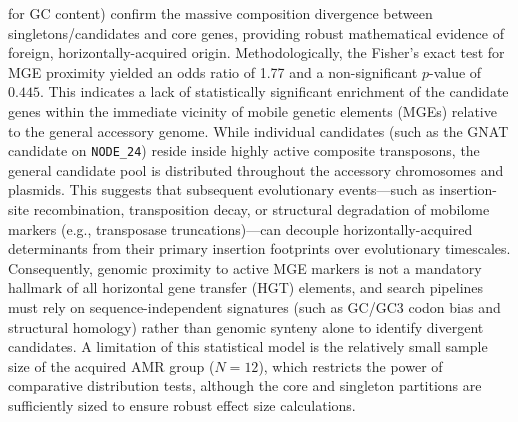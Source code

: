 \documentclass[pdflatex,sn-mathphys-num]{sn-jnl}
\begin{document}
for GC content) confirm the massive composition divergence between singletons/candidates and core genes, providing robust mathematical evidence of foreign, horizontally-acquired origin. Methodologically, the Fisher's exact test for MGE proximity yielded an odds ratio of 1.77 and a non-significant $p$-value of $0.445$. This indicates a lack of statistically significant enrichment of the candidate genes within the immediate vicinity of mobile genetic elements (MGEs) relative to the general accessory genome. While individual candidates (such as the GNAT candidate on \texttt{NODE\_24}) reside inside highly active composite transposons, the general candidate pool is distributed throughout the accessory chromosomes and plasmids. This suggests that subsequent evolutionary events—such as insertion-site recombination, transposition decay, or structural degradation of mobilome markers (e.g., transposase truncations)—can decouple horizontally-acquired determinants from their primary insertion footprints over evolutionary timescales. Consequently, genomic proximity to active MGE markers is not a mandatory hallmark of all horizontal gene transfer (HGT) elements, and search pipelines must rely on sequence-independent signatures (such as GC/GC3 codon bias and structural homology) rather than genomic synteny alone to identify divergent candidates. A limitation of this statistical model is the relatively small sample size of the acquired AMR group ($N=12$), which restricts the power of comparative distribution tests, although the core and singleton partitions are sufficiently sized to ensure robust effect size calculations. 
\end{document}
